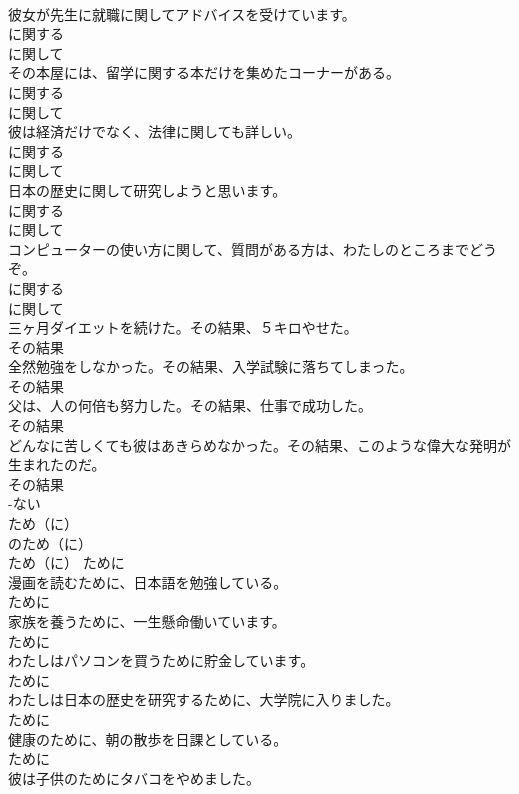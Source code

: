 \documentclass[8pt]{extreport}
\begin{document}
\begin{CJK}{UTF8}{min}
\\	彼女が先生に就職に関してアドバイスを受けています。	
\\	に関する 
\\	に関して
\\	その本屋には、留学に関する本だけを集めたコーナーがある。	
\\	に関する 
\\	に関して
\\	彼は経済だけでなく、法律に関しても詳しい。	
\\	に関する 
\\	に関して
\\	日本の歴史に関して研究しようと思います。	
\\	に関する 
\\	に関して
\\	コンピューターの使い方に関して、質問がある方は、わたしのところまでどうぞ。	
\\	に関する 
\\	に関して
\\	三ヶ月ダイエットを続けた。その結果、５キロやせた。	
\\	その結果
\\	全然勉強をしなかった。その結果、入学試験に落ちてしまった。	
\\	その結果
\\	父は、人の何倍も努力した。その結果、仕事で成功した。	
\\	その結果
\\	どんなに苦しくても彼はあきらめなかった。その結果、このような偉大な発明が生まれたのだ。	
\\	その結果
\\	-ない
\\	ため（に）	
\\	のため（に）	
\\	ため（に）	ために
\\	漫画を読むために、日本語を勉強している。	
\\	ために
\\	家族を養うために、一生懸命働いています。	
\\	ために
\\	わたしはパソコンを買うために貯金しています。	
\\	ために
\\	わたしは日本の歴史を研究するために、大学院に入りました。	
\\	ために
\\	健康のために、朝の散歩を日課としている。	
\\	ために
\\	彼は子供のためにタバコをやめました。	

\end{CJK}
\end{document}
